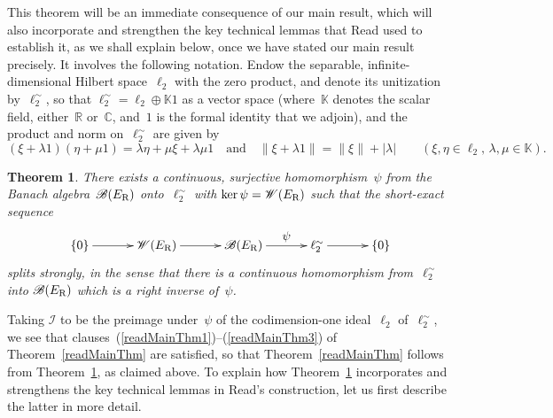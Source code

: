 \documentclass[12pt,reqno]{amsart}
\newtheorem{theorem}{Theorem}[section]
\theoremstyle{definition}
\numberwithin{equation}{section}
\newcommand{\romanref}[1]{{\normalfont\textrm{(\ref{#1})}}}
\newcommand{\R}{\mathbb{R}}
\newcommand{\C}{\mathbb{C}}
\newcommand{\K}{\mathbb{K}}
\begin{document}
This theorem will be an immediate consequence of our main result,
which will also incorporate and strengthen the key technical lemmas
that Read used to establish it, as we shall explain below, once we
have stated our main result precisely. It involves the following
notation. Endow the separable, infinite-dimensional Hilbert
space~$\ell_2$ with the zero product, and denote its unitization
by~$\ell_2^{\sim}$, so that $\ell_2^{\sim} = \ell_2\oplus\K 1$ as a
vector space (where~$\K$ denotes the scalar field, either~$\R$
or~$\C$, and~$1$ is the formal identity that we adjoin), and the
product and norm on~$\ell_2^{\sim}$ are given by
\[ (\xi + \lambda
1)(\eta+\mu 1) = \lambda \eta+\mu \xi+ \lambda\mu 1\quad
\text{and}\quad \|\xi + \lambda 1\| = \|\xi\| + |\lambda|\qquad
(\xi,\eta\in\ell_2,\, \lambda,\mu\in\mathbb{K}). \]%
\begin{theorem}\label{WEBEsplitexact} There exists a continuous, 
surjective homomorphism~$\psi$ from the Banach
algebra~$\mathscr{B}(E_{\normalfont{\text{R}}})$ onto~$\ell_2^{\sim}$
with $\ker\psi = \mathscr{W}(E_{\normalfont{\text{R}}})$ such that the
short-exact sequence
\[ \spreaddiagramcolumns{2ex}\xymatrix{\{0\}\ar[r] &
    \mathscr{W}(E_{\normalfont{\text{R}}})\ar[r] &
    \mathscr{B}(E_{\normalfont{\text{R}}})\ar^-{\displaystyle{\psi}}[r]
    & \ell_2^{\sim}\ar[r] & \{0\}} \]
splits strongly, in the sense that there is a
continuous homomorphism from~$\ell_2^{\sim}$ into
$\mathscr{B}(E_{\normalfont{\text{R}}})$ which is a right inverse
of~$\psi$.
\end{theorem}

Taking $\mathscr{I}$ to be the preimage under~$\psi$ of the
codimension-one ideal~$\ell_2$ of~$\ell_2^{\sim}$, we see that
clauses~\romanref{readMainThm1}--\romanref{readMainThm3} of
Theorem~\ref{readMainThm} are satisfied, so
that Theorem~\ref{readMainThm} follows from Theorem~\ref{WEBEsplitexact},
as claimed above.  To explain how Theorem~\ref{WEBEsplitexact} 
incorporates and strengthens the key technical lemmas in Read's
construction, let us first describe the latter in more detail.
\end{document}
